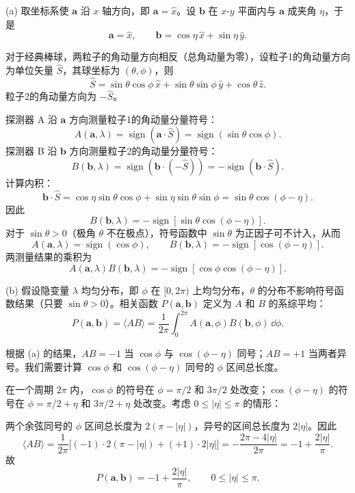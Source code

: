 \begin{solution}
(a) 取坐标系使 $\mathbf a$ 沿 $x$ 轴方向，即 $\mathbf a = \hat x$。设 $\mathbf b$ 在 $x$-$y$ 平面内与 $\mathbf a$ 成夹角 $\eta$，于是
\[
\mathbf a = \hat x,\qquad \mathbf b = \cos\eta\,\hat x + \sin\eta\,\hat y.
\]

对于经典棒球，两粒子的角动量方向相反（总角动量为零），设粒子1的角动量方向为单位矢量 $\hat S$，其球坐标为 $(\theta,\phi)$，则
\[
\hat S = \sin\theta\cos\phi\,\hat x + \sin\theta\sin\phi\,\hat y + \cos\theta\,\hat z.
\]
粒子2的角动量方向为 $-\hat S$。

探测器 A 沿 $\mathbf a$ 方向测量粒子1的角动量分量符号：
\[
A(\mathbf a,\lambda) = \operatorname{sign}(\mathbf a\cdot\hat S) = \operatorname{sign}(\sin\theta\cos\phi).
\]
探测器 B 沿 $\mathbf b$ 方向测量粒子2的角动量分量符号：
\[
B(\mathbf b,\lambda) = \operatorname{sign}(\mathbf b\cdot(-\hat S)) = -\operatorname{sign}(\mathbf b\cdot\hat S).
\]
计算内积：
\[
\mathbf b\cdot\hat S = \cos\eta\sin\theta\cos\phi + \sin\eta\sin\theta\sin\phi = \sin\theta\cos(\phi-\eta).
\]
因此
\[
B(\mathbf b,\lambda) = -\operatorname{sign}[\sin\theta\cos(\phi-\eta)].
\]
对于 $\sin\theta > 0$（极角 $\theta$ 不在极点），符号函数中 $\sin\theta$ 为正因子可不计入，从而
\[
A(\mathbf a,\lambda) = \operatorname{sign}(\cos\phi),\qquad
B(\mathbf b,\lambda) = -\operatorname{sign}[\cos(\phi-\eta)].
\]
两测量结果的乘积为
\[
\boxed{A(\mathbf a,\lambda)B(\mathbf b,\lambda) = -\operatorname{sign}[\cos\phi\cos(\phi-\eta)].}
\]

(b) 假设隐变量 $\lambda$ 均匀分布，即 $\phi$ 在 $[0,2\pi)$ 上均匀分布，$\theta$ 的分布不影响符号函数结果（只要 $\sin\theta>0$）。相关函数 $P(\mathbf a,\mathbf b)$ 定义为 $A$ 和 $B$ 的系综平均：
\[
P(\mathbf a,\mathbf b) = \langle AB\rangle = \frac{1}{2\pi}\int_0^{2\pi} A(\mathbf a,\phi)B(\mathbf b,\phi)\,\dd\phi.
\]

根据 (a) 的结果，$AB = -1$ 当 $\cos\phi$ 与 $\cos(\phi-\eta)$ 同号；$AB = +1$ 当两者异号。我们需要计算 $\cos\phi$ 和 $\cos(\phi-\eta)$ 同号的 $\phi$ 区间总长度。

在一个周期 $2\pi$ 内，$\cos\phi$ 的符号在 $\phi = \pi/2$ 和 $3\pi/2$ 处改变；$\cos(\phi-\eta)$ 的符号在 $\phi = \pi/2+\eta$ 和 $3\pi/2+\eta$ 处改变。考虑 $0\le |\eta|\le\pi$ 的情形：

两个余弦同号的 $\phi$ 区间总长度为 $2(\pi-|\eta|)$，异号的区间总长度为 $2|\eta|$。因此
\[
\langle AB\rangle = \frac{1}{2\pi}\bigl[(-1)\cdot 2(\pi-|\eta|) + (+1)\cdot 2|\eta|\bigr]
= -\frac{2\pi-4|\eta|}{2\pi} = -1 + \frac{2|\eta|}{\pi}.
\]
故
\[
\boxed{P(\mathbf a,\mathbf b) = -1 + \frac{2|\eta|}{\pi},\qquad 0\le|\eta|\le\pi.}
\]


\end{solution}
